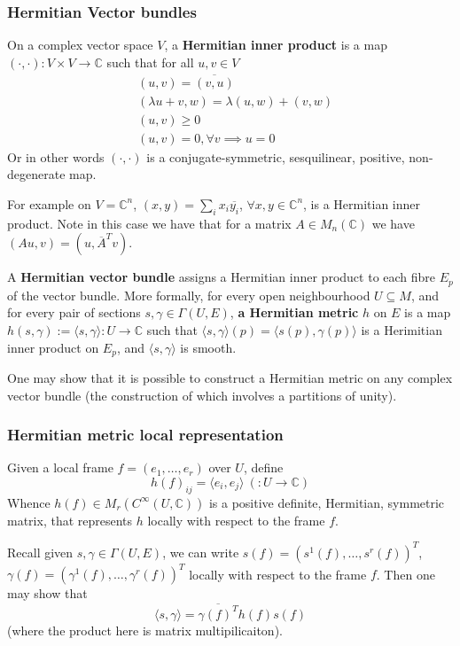 \documentclass[a4paper]{article}
\theoremstyle{definition} \newtheorem*{definition}{Definition}
\theoremstyle{definition} \newtheorem*{definitions}{Definitions}
\theoremstyle{plain} \newtheorem{theorem}{Theorem}[section]
\theoremstyle{plain} \newtheorem{proposition}[theorem]{Proposition}
\theoremstyle{plain} \newtheorem{corollary}[theorem]{Corollary}
\theoremstyle{plain} \newtheorem{lemma}[theorem]{Lemma}
\theoremstyle{plain} \newtheorem{example}[theorem]{Example}
\newcommand{\defn}[1]{\textbf{#1}}
\newcommand{\complexnos}{\mathbb{C}}
\newcommand{\smoothCmaps}{C^\infty (U, \complexnos)}
\begin{document}
\subsubsection{Hermitian Vector bundles}
On a complex vector space $V$, a \defn{Hermitian inner product} is a map $(\cdot, \cdot):V\times V\to \complexnos$ such that for all $u,v\in V$
\begin{align*}
& (u,v)=\overline{(v, u)} \\
& (\lambda u + v, w) = \lambda (u, w) + (v, w) \\
& (u, v)\geq 0 \\
& (u,v)=0, \forall v \implies u=0
\end{align*}
Or in other words $(\cdot, \cdot)$ is a conjugate-symmetric, sesquilinear, positive, non-degenerate map. 

For example on $V=\complexnos^n$, $(x, y)=\sum_i x_i\overline{y_i}$, $\forall x,y\in \complexnos^n$, is a Hermitian inner product. Note in this case we have that for a matrix $A\in M_n(\complexnos)$ we have $(Au, v)=(u, \overline{A}^Tv)$.

A \defn{Hermitian vector bundle} assigns a Hermitian inner product to each fibre $E_p$ of the vector bundle. More formally, for every open neighbourhood $U\subseteq M$, and for every pair of sections $s, \gamma \in \Gamma(U, E)$, \defn{a Hermitian metric} $h$ on $E$ is a map $h(s, \gamma):=\langle s, \gamma \rangle:U\to \complexnos$ such that $\langle s, \gamma \rangle(p)=\langle s(p), \gamma (p) \rangle$ is a Herimitian inner product on $E_p$, and $\langle s, \gamma \rangle$ is smooth. 

One may show that it is possible to construct a Hermitian metric on any complex vector bundle (the construction of which involves a partitions of unity). 

\subsubsection{Hermitian metric local representation}
Given a local frame $f=(e_1, \ldots, e_r)$ over $U$, define 
$$h(f)_{ij}=\langle e_i, e_j \rangle \ (:U\to \complexnos)$$
Whence $h(f)\in M_r(\smoothCmaps)$ is a positive definite, Hermitian, symmetric matrix, that represents $h$ locally with respect to the frame $f$. 

Recall given $s, \gamma\in \Gamma(U, E)$, we can write $s(f)=(s^1(f), \ldots, s^r(f))^T$, $\gamma(f)=(\gamma^1(f), \ldots, \gamma^r(f))^T$ locally with respect to the frame $f$. Then one may show that 
$$\langle s, \gamma \rangle = \overline{\gamma(f)^T}h(f)s(f)$$
(where the product here is matrix multipilicaiton).
\end{document}
